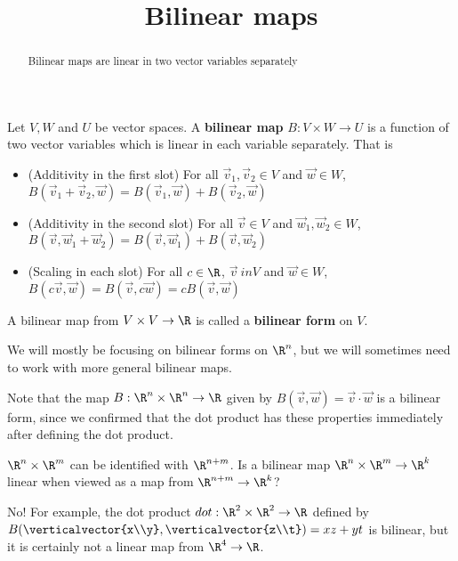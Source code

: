 \documentclass{ximera}
\title{Bilinear maps}
\begin{document}
\begin{abstract}
	Bilinear maps are linear in two vector variables separately 
\end{abstract}	

	\begin{definition}
		Let $V,W$ and $U$ be vector spaces.  A \textbf{bilinear map} $B: V \times W \to U$ is a function of two vector variables which is linear in each variable separately. 
		That is
			\begin{itemize}
				\item (Additivity in the first slot) For all $\vec{v}_1,\vec{v}_2 \in V$ and 
				$\vec{w} \in W$, $B(\vec{v}_1+\vec{v}_2,\vec{w}) = B(\vec{v}_1,\vec{w})+B(\vec{v}_2,\vec{w})$
				
				\item (Additivity in the second slot) For all $\vec{v} \in V$ and 
				$\vec{w}_1,\vec{w}_2 \in W$, $B(\vec{v},\vec{w}_1+\vec{w}_2) = B(\vec{v},\vec{w}_1)+B(\vec{v},\vec{w}_2)$
				
				\item (Scaling in each slot) For all $c \in \R$, $\vec{v} \ in V$ and 
				$\vec{w} \in W$, $B(c\vec{v},\vec{w}) = B(\vec{v},c\vec{w}) = cB(\vec{v},\vec{w})$
			\end{itemize}
	\end{definition}
	
	A bilinear map from $V \times V \to \R$ is called a \textbf{bilinear form} on $V$.
	
	We will mostly be focusing on bilinear forms on $\R^n$, but we will sometimes need to work with more general bilinear maps.
	
	Note that the map $B:\R^n \times \R^n \to \R$ given by $B(\vec{v},\vec{w}) = \vec{v} \cdot \vec{w}$ is a bilinear form, since we confirmed that
	the dot product has these properties immediately after defining the dot product.
	
		$\R^n \times \R^m$ can be identified with $\R^{n+m}$.  Is a bilinear map $\R^n \times \R^m \to \R^k$ linear when viewed as a map from $\R^{n+m} \to \R^k$?
	\begin{free-response}
		No!  For example, the dot product $dot:\R^2 \times \R^2 \to \R$ defined by $B(\verticalvector{x\\y},\verticalvector{z\\t})=xz+yt$ is bilinear, but it is certainly not a linear map from $\R^4 \to \R$.
	\end{free-response}
	
\end{document}
